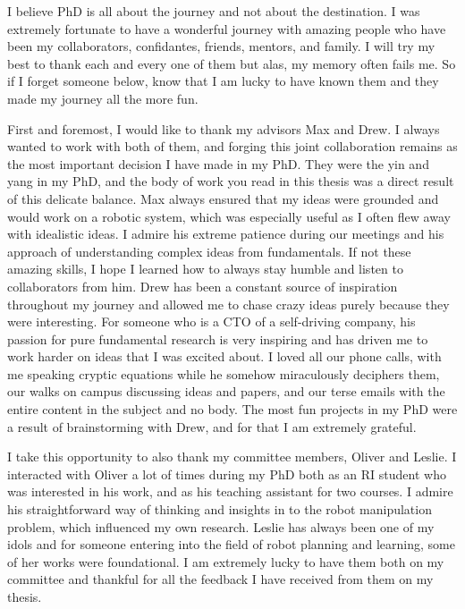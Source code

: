 \documentclass[11pt]{cmuthesis}
\begin{document}
\begin{acknowledgments}
  I believe PhD is all about the journey and not about the destination. I was
  extremely fortunate to have a
  wonderful journey
  with amazing people who have been my collaborators, confidantes,
  friends, mentors, and family. I will try my best to thank each and every one of them
  but alas, my memory often fails me. So if I forget someone below, know that I am
  lucky to have known them and they made my journey all the more fun.

  First and foremost, I would like to thank my advisors Max and Drew. I always
  wanted to work with both of them, and forging this joint
  collaboration remains as the most important decision I have made in
  my PhD. They were the yin and yang in my PhD, and the body of work
  you read in this thesis was a direct result of this
  delicate balance. Max always ensured that my ideas were grounded and
  would work on a robotic system, which was especially useful as I often
  flew away with idealistic ideas. I admire his extreme patience
  during our meetings and his approach of understanding complex ideas
  from fundamentals. If not these amazing skills, I hope I learned how
  to always stay humble and listen to collaborators from him. Drew has been a
  constant source of inspiration throughout my journey and allowed me
  to chase crazy ideas purely because they were interesting. For someone
  who is a CTO of a self-driving company, his passion for pure fundamental
  research is very inspiring and has driven me to work harder on ideas
  that I was excited about. I loved all our phone calls, with me
  speaking cryptic equations while he somehow miraculously deciphers
  them, our walks on campus discussing ideas and papers, and our terse
  emails with the entire content in the subject and no body. The most
  fun projects in my PhD were a result of brainstorming with Drew, and
  for that I am extremely grateful.

  I take this opportunity to also thank my committee members,
  Oliver and Leslie. I interacted with Oliver a lot of times during my
  PhD both as an RI student who was interested in his work, and as his
  teaching assistant for two courses. I admire his straightforward way
  of thinking and insights in to the robot manipulation problem, which
  influenced my own research. Leslie has always been one of my idols
  and for someone entering into the field of robot planning and
  learning, some of her works were foundational. I am extremely lucky
  to have them both on my committee and thankful for all the feedback
  I have received from them on my thesis.


\end{acknowledgments}
\end{document}
